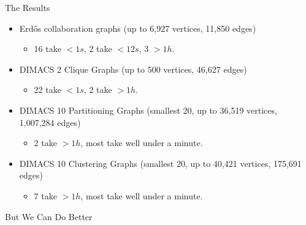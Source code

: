 \documentclass{beamer}
\begin{document}
\begin{frame}{The Results}
    \begin{itemize}
        \item Erd\H{o}s collaboration graphs (up to 6,927 vertices, 11,850 edges)
            \begin{itemize}
                \item 16 take $<1s$, 2 take $<12s$, 3 $>1h$.
            \end{itemize}

        \item DIMACS 2 Clique Graphs (up to 500 vertices, 46,627 edges)
            \begin{itemize}
                \item 22 take $<1s$, 2 take $>1h$.
            \end{itemize}

        \item DIMACS 10 Partitioning Graphs (smallest 20, up to 36,519 vertices, 1,007,284 edges)
            \begin{itemize}
                \item 2 take $>1h$, most take well under a minute.
            \end{itemize}

        \item DIMACS 10 Clustering Graphs (smallest 20, up to 40,421 vertices, 175,691 edges)
            \begin{itemize}
                \item 7 take $>1h$, most take well under a minute.
            \end{itemize}
    \end{itemize}
\end{frame}

\begin{frame}{But We Can Do Better}
    \centering
\end{frame}
\end{document}
